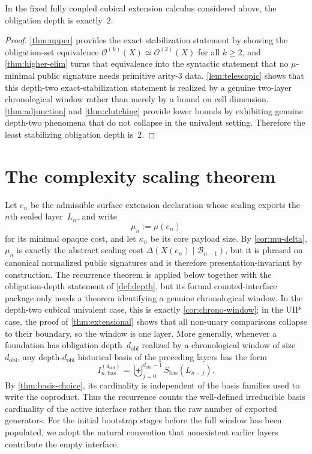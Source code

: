 \documentclass{lmcs}
\newcommand{\B}{\mathcal{B}}
\newcommand{\Ocal}{\mathcal{O}}
\begin{document}
\begin{cor}
\label{cor:d2}
In the fixed fully coupled cubical extension calculus considered above, the obligation depth is exactly~$2$.
\end{cor}

\begin{proof}
\autoref{thm:upper} provides the exact stabilization statement by showing the obligation-set equivalence $\Ocal^{(k)}(X) \simeq \Ocal^{(2)}(X)$ for all $k \geq 2$, and \autoref{thm:higher-elim} turns that equivalence into the syntactic statement that no $\mu$-minimal public signature needs primitive arity-$3$ data. \autoref{lem:telescopic} shows that this depth-two exact-stabilization statement is realized by a genuine two-layer chronological window rather than merely by a bound on cell dimension. \autoref{thm:adjunction} and \autoref{thm:clutching} provide lower bounds by exhibiting genuine depth-two phenomena that do not collapse in the univalent setting. Therefore the least stabilizing obligation depth is~$2$.
\end{proof}

\section{The complexity scaling theorem}
\label{sec:scaling}

Let $e_n$ be the admissible surface extension declaration whose sealing exports the $n$th sealed layer~$L_n$, and write
\[
  \mu_n := \mu(e_n)
\]
for its minimal opaque cost, and let $\kappa_n$ be its core payload size. By \autoref{cor:mu-delta}, $\mu_n$ is exactly the abstract sealing cost $\Delta(X(e_n)\mid\B_{n-1})$, but it is phrased on canonical normalized public signatures and is therefore presentation-invariant by construction. The recurrence theorem is applied below together with the obligation-depth statement of \autoref{def:depth}, but its formal counted-interface package only needs a theorem identifying a genuine chronological window. In the depth-two cubical univalent case, this is exactly \autoref{cor:chrono-window}; in the UIP case, the proof of \autoref{thm:extensional} shows that all non-unary comparisons collapse to their boundary, so the window is one layer. More generally, whenever a foundation has obligation depth~$d_{\mathrm{obl}}$ realized by a chronological window of size~$d_{\mathrm{obl}}$, any depth-$d_{\mathrm{obl}}$ historical basis of the preceding layers has the form
\[
  I_{n,\mathrm{bas}}^{(d_{\mathrm{obl}})} = \biguplus_{j=0}^{d_{\mathrm{obl}}-1} S_{\mathrm{bas}}(L_{n-j}).
\]
By \autoref{thm:basis-choice}, its cardinality is independent of the basis families used to write the coproduct. Thus the recurrence counts the well-defined irreducible basis cardinality of the active interface rather than the raw number of exported generators. For the initial bootstrap stages before the full window has been populated, we adopt the natural convention that nonexistent earlier layers contribute the empty interface.
\end{document}
